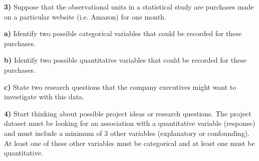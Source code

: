 \documentclass{article}
\newif\ifPrintSolution
\newcommand{\sol}[1]{\ifPrintSolution {\color{blue} #1 } \fi}
\begin{document}
\sol{Each of the 20 students.}

\vspace{0.35in}


\newpage


\textbf{3) } Suppose that the observational units in a statistical study are purchases made on a particular website (i.e. Amazon) for one month.

\hspace{0.1in} \textbf{a) } Identify two possible categorical variables that could be recorded for these purchases.

\sol{Answers will vary. Possibilities could be ``what is the item purchased", ``is it a gift", ``is it next-day shipping", ``is this a recurring purchase"}

\vspace{0.25in}

\hspace{0.1in} \textbf{b) } Identify two possible quantitative variables that could be recorded for these purchases.

\sol{Answers will vary. Possibilities could be ``how many items purchases", ``total cost", ``calculated tax"}

\vspace{0.25in}

\hspace{0.1in} \textbf{c) } State two research questions that the company executives might want to investigate with this data.

\sol{Answers will vary. Examples include ``What items sell the most" and ``are recurring purchases, on average, more profitable than one-time purchases?"}

\vspace{1in}

\textbf{4) } Start thinking about possible project ideas or research questions. The project dataset must be looking for an association with a quantitative variable (response) and must include a minimum of 3 other variables (explanatory or confounding). At least one of these other variables must be categorical and at least one must be quantitative. 
\end{document}
